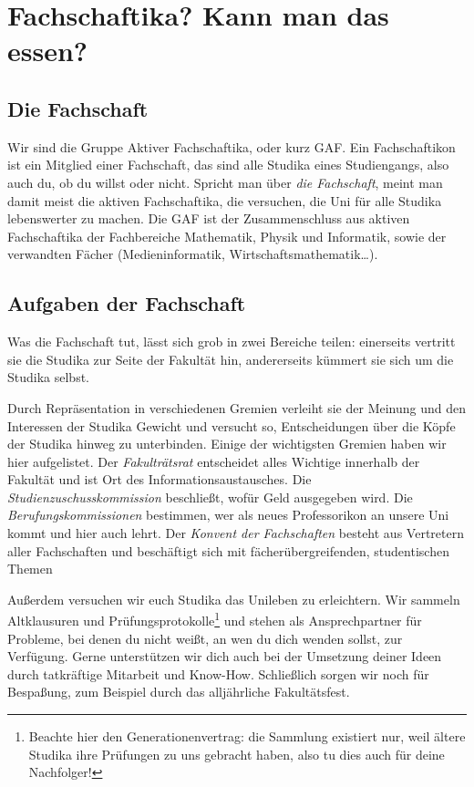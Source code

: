 
%
	
\chapter{Fachschaftika? Kann man das essen?}

\section{Die Fachschaft}
Wir sind die Gruppe Aktiver Fachschaftika, oder kurz GAF. Ein Fachschaftikon ist ein Mitglied einer Fachschaft, das sind alle Studika eines Studiengangs, also auch du, ob du willst oder nicht. Spricht man über \emph{die Fachschaft}, meint man damit meist die aktiven Fachschaftika, die versuchen, die Uni für alle Studika lebenswerter zu machen. Die GAF ist der Zusammenschluss aus aktiven Fachschaftika der Fachbereiche Mathematik, Physik und Informatik, sowie der verwandten Fächer (Medieninformatik, Wirtschaftsmathematik\ldots).

\section{Aufgaben der Fachschaft}

Was die Fachschaft tut, lässt sich grob in zwei Bereiche teilen: einerseits vertritt sie die Studika zur Seite der Fakultät hin, andererseits kümmert sie sich um die Studika selbst.

Durch Repräsentation in verschiedenen Gremien verleiht sie der Meinung und den Interessen der Studika Gewicht und versucht so, Entscheidungen über die Köpfe der Studika hinweg zu unterbinden. Einige der wichtigsten Gremien haben wir hier aufgelistet.
Der \emph{Fakulträtsrat} entscheidet alles Wichtige innerhalb der Fakultät und ist Ort des Informationsaustausches.
Die \emph{Studienzuschusskommission} beschließt, wofür Geld ausgegeben wird.
Die \emph{Berufungskommissionen} bestimmen, wer als neues Professorikon an unsere Uni kommt und hier auch lehrt.
Der \emph{Konvent der Fachschaften} besteht aus Vertretern aller Fachschaften und beschäftigt sich mit fächerübergreifenden, studentischen Themen

Außerdem versuchen wir euch Studika das Unileben zu erleichtern. Wir sammeln Altklausuren und Prüfungsprotokolle\footnote{Beachte hier den Generationenvertrag: die Sammlung existiert nur, weil ältere Studika ihre Prüfungen zu uns gebracht haben, also tu dies auch für deine Nachfolger!} und stehen als Ansprechpartner für Probleme, bei denen du nicht weißt, an wen du dich wenden sollst, zur Verfügung. Gerne unterstützen wir dich auch bei der Umsetzung deiner Ideen durch tatkräftige Mitarbeit und Know-How. Schließlich sorgen wir noch für Bespaßung, zum Beispiel durch das alljährliche Fakultätsfest.

